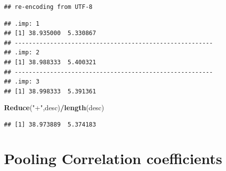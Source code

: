 \documentclass[]{book}
\newenvironment{Shaded}{\begin{snugshade}}{\end{snugshade}}
\newcommand{\KeywordTok}[1]{\textcolor[rgb]{0.13,0.29,0.53}{\textbf{#1}}}
\newcommand{\DataTypeTok}[1]{\textcolor[rgb]{0.13,0.29,0.53}{#1}}
\newcommand{\DecValTok}[1]{\textcolor[rgb]{0.00,0.00,0.81}{#1}}
\newcommand{\StringTok}[1]{\textcolor[rgb]{0.31,0.60,0.02}{#1}}
\newcommand{\CommentTok}[1]{\textcolor[rgb]{0.56,0.35,0.01}{\textit{#1}}}
\newcommand{\OtherTok}[1]{\textcolor[rgb]{0.56,0.35,0.01}{#1}}
\newcommand{\ControlFlowTok}[1]{\textcolor[rgb]{0.13,0.29,0.53}{\textbf{#1}}}
\newcommand{\OperatorTok}[1]{\textcolor[rgb]{0.81,0.36,0.00}{\textbf{#1}}}
\newcommand{\NormalTok}[1]{#1}
\begin{document}
\begin{verbatim}
## re-encoding from UTF-8
\end{verbatim}

\begin{Shaded}
\end{Shaded}

\begin{verbatim}
## .imp: 1
## [1] 38.935000  5.330867
## -------------------------------------------------------- 
## .imp: 2
## [1] 38.988333  5.400321
## -------------------------------------------------------- 
## .imp: 3
## [1] 38.998333  5.391361
\end{verbatim}

\begin{Shaded}
\begin{Highlighting}[]
\KeywordTok{Reduce}\NormalTok{(}\StringTok{"+"}\NormalTok{,desc)}\OperatorTok{/}\KeywordTok{length}\NormalTok{(desc)}
\end{Highlighting}
\end{Shaded}

\begin{verbatim}
## [1] 38.973889  5.374183
\end{verbatim}

\section{Pooling Correlation
coefficients}\label{pooling-correlation-coefficients}
\end{document}
